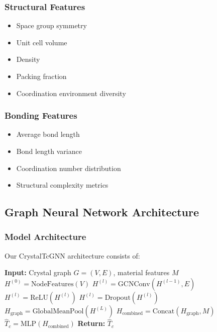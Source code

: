 \documentclass[11pt,a4paper]{article}
\begin{document}
\subsubsection{Structural Features}
\begin{itemize}
    \item Space group symmetry
    \item Unit cell volume
    \item Density
    \item Packing fraction
    \item Coordination environment diversity
\end{itemize}

\subsubsection{Bonding Features}
\begin{itemize}
    \item Average bond length
    \item Bond length variance
    \item Coordination number distribution
    \item Structural complexity metrics
\end{itemize}

\subsection{Graph Neural Network Architecture}

\subsubsection{Model Architecture}

Our CrystalTcGNN architecture consists of:

\begin{algorithm}[H]
\caption{CrystalTcGNN Forward Pass}
\begin{algorithmic}[1]
\State \textbf{Input:} Crystal graph $G = (V, E)$, material features $M$
\State $H^{(0)} = \text{NodeFeatures}(V)$ 
    \State $H^{(l)} = \text{GCNConv}(H^{(l-1)}, E)$ 
    \State $H^{(l)} = \text{ReLU}(H^{(l)})$ 
    \State $H^{(l)} = \text{Dropout}(H^{(l)})$ 
\EndFor
\State $H_{\text{graph}} = \text{GlobalMeanPool}(H^{(L)})$ 
\State $H_{\text{combined}} = \text{Concat}(H_{\text{graph}}, M)$ 
\State $\hat{T}_c = \text{MLP}(H_{\text{combined}})$ 
\State \textbf{Return:} $\hat{T}_c$
\end{algorithmic}
\end{algorithm}
\end{document}
